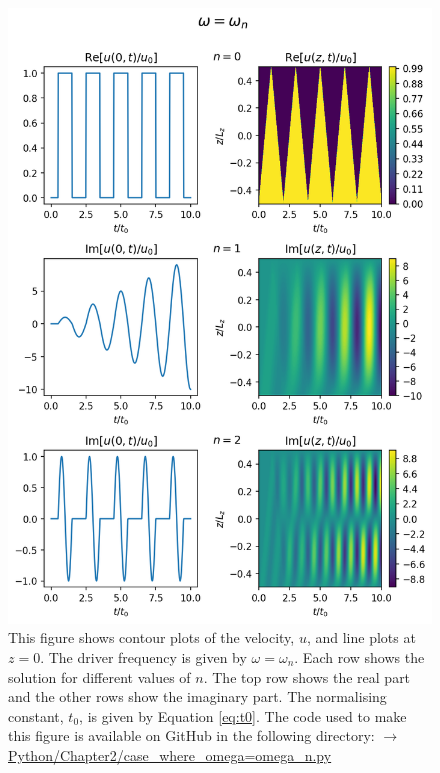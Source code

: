 \begin{figure}
    \centering
    \vspace{-30pt}
    \includegraphics[width=\textwidth,height=0.94\textheight,keepaspectratio]{figures/chapter02/case_where_omega=omega_n_u.png}
    \vspace{-10pt}
    \caption{This figure shows contour plots of the velocity, $u$, and line plots at $z=0$. The driver frequency is given by $\omega=\omega_n$. Each row shows the solution for different values of $n$. The top row shows the real part and the other rows show the imaginary part. The normalising constant, $t_0$, is given by Equation \eqref{eq:t0}. The code used to make this figure is available on GitHub in the following directory:\newline
    \href{https://github.com/aleksyprok/apkp_thesis/blob/main/Python/Chapter2/case_where_omega\%3Domega_n.py}{$\rightarrow$ Python/Chapter2/case\_where\_omega=omega\_n.py}
    }
    \label{fig:case_where_omega=omega_n_u}
    \vspace{-30pt}
\end{figure}

